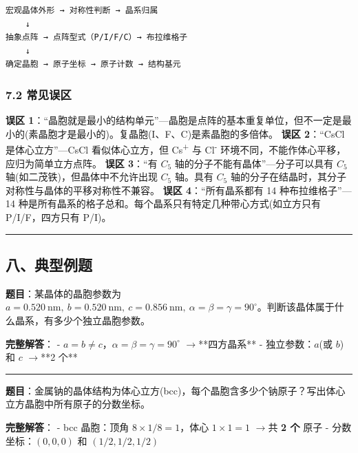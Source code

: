 \documentclass[a4paper,11pt]{ctexart}
\newcommand{\箭}{\ensuremath{\rightarrow}}
\newcommand{\左箭}{\ensuremath{\leftarrow}}
\newcommand{\上箭}{\ensuremath{\uparrow}}
\newcommand{\下箭}{\ensuremath{\downarrow}}
\newcommand{\衡}{\ensuremath{\rightleftharpoons}}
\newcommand{\双箭}{\ensuremath{\leftrightarrow}}
\newcommand{\约等于}{\ensuremath{\approx}}
\newcommand{\小于等于}{\ensuremath{\leq}}
\newcommand{\大于等于}{\ensuremath{\geq}}
\newcommand{\不等于}{\ensuremath{\neq}}
\newcommand{\西格马}{\ensuremath{\sigma}}
\newcommand{\派}{\ensuremath{\pi}}
\begin{document}
\begin{verbatim}
宏观晶体外形 → 对称性判断 → 晶系归属
    ↓
抽象点阵 → 点阵型式（P/I/F/C）→ 布拉维格子
    ↓
确定晶胞 → 原子坐标 → 原子计数 → 结构基元
\end{verbatim}

\subsubsection{7.2 常见误区}\label{ux5e38ux89c1ux8befux533a}

\textbf{误区 1}：``晶胞就是最小的结构单元''---晶胞是点阵的基本重复单位，但不一定是最小的(素晶胞才是最小的)。复晶胞(I、F、C)是素晶胞的多倍体。
\textbf{误区 2}：``CsCl 是体心立方''---CsCl 看似体心立方，但 Cs\textsuperscript{+} 与 Cl\textsuperscript{-} 环境不同，不能作体心平移，应归为简单立方点阵。
\textbf{误区 3}：``有 \(C_5\) 轴的分子不能有晶体''---分子可以具有 \(C_5\) 轴(如二茂铁)，但晶体中不允许出现 \(C_5\) 轴。具有 \(C_5\) 轴的分子在结晶时，其分子对称性与晶体的平移对称性不兼容。
\textbf{误区 4}：``所有晶系都有 14 种布拉维格子''---14 种是所有晶系的格子总和。每个晶系只有特定几种带心方式(如立方只有 P/I/F，四方只有 P/I)。

\begin{center}\rule{0.5\linewidth}{0.5pt}\end{center}

\subsection{八、典型例题}\label{ux516bux5178ux578bux4f8bux9898}

\textbf{题目}：某晶体的晶胞参数为 \(a = 0.520\ \mathrm{nm},\ b = 0.520\ \mathrm{nm},\ c = 0.856\ \mathrm{nm},\ \alpha = \beta = \gamma = 90^\circ\)。判断该晶体属于什么晶系，有多少个独立晶胞参数。

\textbf{完整解答}：
- \(a = b \neq c\)，\(\alpha = \beta = \gamma = 90^\circ\) \箭 **四方晶系**
- 独立参数：\(a\)(或 \(b\))和 \(c\) \箭 **2 个**

\begin{center}\rule{0.5\linewidth}{0.5pt}\end{center}

\textbf{题目}：金属钠的晶体结构为体心立方(bcc)，每个晶胞含多少个钠原子？写出体心立方晶胞中所有原子的分数坐标。

\textbf{完整解答}：
- bcc 晶胞：顶角 \(8 \times 1/8 = 1\)，体心 \(1 \times 1 = 1\) \箭 共 \textbf{2 个} 原子
- 分数坐标：\((0, 0, 0)\) 和 \((1/2, 1/2, 1/2)\)
\end{document}
